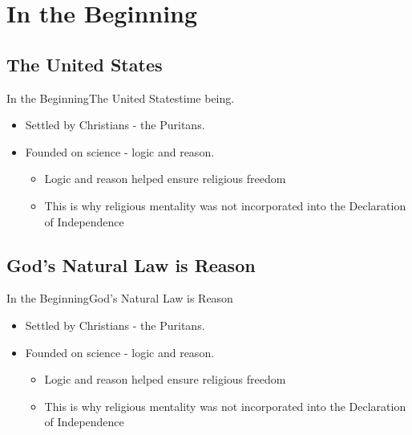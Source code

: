 \section{In the Beginning}
\subsection{The United States}
\begin{frame}{In the Beginning}{The United States}time being.
	\begin{itemize}
		\item<1 -> Settled by Christians - the Puritans.
		\item<2 -> Founded on science - logic and reason.
			\begin{itemize}
				\item<3 -> Logic and reason helped ensure religious freedom
				\item<3 -> This is why religious mentality was not incorporated into the Declaration of Independence
			\end{itemize}
	\end{itemize}
\end{frame}

\subsection{God's Natural Law is Reason}
\begin{frame}{In the Beginning}{God's Natural Law is Reason}
	\begin{itemize}
		\item<1 -> Settled by Christians - the Puritans.
		\item<2 -> Founded on science - logic and reason.
			\begin{itemize}
				\item<3 -> Logic and reason helped ensure religious freedom
				\item<3 -> This is why religious mentality was not incorporated into the Declaration of Independence
			\end{itemize}
	\end{itemize}
\end{frame}
